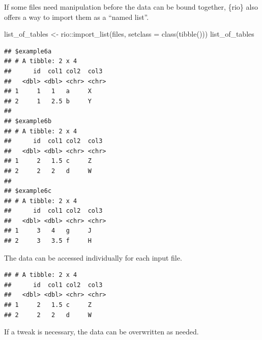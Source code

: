 \documentclass[]{book}
\newenvironment{Shaded}{}{}
\newcommand{\DataTypeTok}[1]{#1}
\newcommand{\KeywordTok}[1]{\textcolor[rgb]{0.00,0.00,1.00}{#1}}
\newcommand{\NormalTok}[1]{#1}
\newcommand{\OperatorTok}[1]{#1}
\newcommand{\StringTok}[1]{\textcolor[rgb]{0.00,0.50,0.50}{#1}}
\begin{document}
If some files need manipulation before the data can be bound together, \{rio\} also offers a way to import them as a ``named list''.

\begin{Shaded}
\begin{Highlighting}[]
\NormalTok{list_of_tables <-}\StringTok{ }\NormalTok{rio}\OperatorTok{::}\KeywordTok{import_list}\NormalTok{(files, }\DataTypeTok{setclass =} \KeywordTok{class}\NormalTok{(}\KeywordTok{tibble}\NormalTok{()))}
\NormalTok{list_of_tables}
\end{Highlighting}
\end{Shaded}

\begin{verbatim}
## $example6a
## # A tibble: 2 x 4
##      id  col1 col2  col3 
##   <dbl> <dbl> <chr> <chr>
## 1     1   1   a     X    
## 2     1   2.5 b     Y    
## 
## $example6b
## # A tibble: 2 x 4
##      id  col1 col2  col3 
##   <dbl> <dbl> <chr> <chr>
## 1     2   1.5 c     Z    
## 2     2   2   d     W    
## 
## $example6c
## # A tibble: 2 x 4
##      id  col1 col2  col3 
##   <dbl> <dbl> <chr> <chr>
## 1     3   4   g     J    
## 2     3   3.5 f     H
\end{verbatim}

The data can be accessed individually for each input file.

\begin{Shaded}
\end{Shaded}

\begin{verbatim}
## # A tibble: 2 x 4
##      id  col1 col2  col3 
##   <dbl> <dbl> <chr> <chr>
## 1     2   1.5 c     Z    
## 2     2   2   d     W
\end{verbatim}

If a tweak is necessary, the data can be overwritten as needed.

\begin{Shaded}
\end{Shaded}
\end{document}
